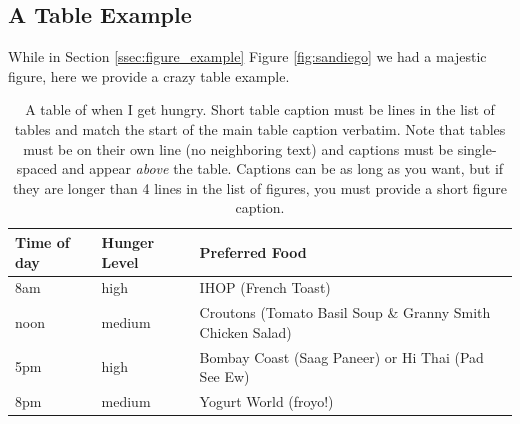 \documentclass[12pt,chapterheads]{ucsd}
\begin{document}
\subsection{A Table Example}

While in Section \ref{ssec:figure_example} Figure \ref{fig:sandiego} we had a majestic figure, here we provide a crazy table example.


\vspace{0.25in}
\begin{table}[!ht]
\caption[A table of when I get hungry.  Short table caption must be  lines in the list of tables]{A table of when I get hungry. Short table caption must be  lines in the list of tables and match the start of the main table caption verbatim.  Note that tables must be on their own line (no neighboring text) and captions must be single-spaced and appear \protect\textit{above} the table.  Captions can be as long as you want, but if they are longer than 4 lines in the list of figures, you must provide a short figure caption.}

\vspace{-0.25in}
\begin{center}
\begin{tabular}{|p{1in}|p{2in}|p{3in}|}

\hline
Time of day & Hunger Level & Preferred Food \\

\hline
8am & high & IHOP (French Toast) \\

\hline
noon & medium & Croutons (Tomato Basil Soup \& Granny Smith Chicken Salad) \\

\hline
5pm & high & Bombay Coast (Saag Paneer) or Hi Thai (Pad See Ew) \\

\hline
8pm & medium & Yogurt World (froyo!) \\

\hline
\end{tabular}
\end{center}
\label{tab:analysis3}
\end{table}



\appendix



\end{document}
